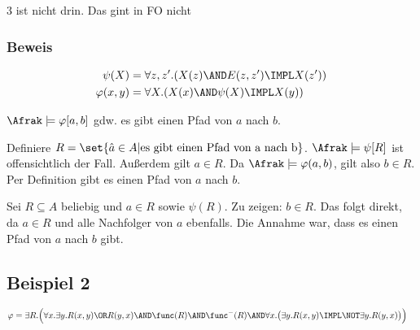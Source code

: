 3 ist nicht drin. Das gint in FO nicht

\subsubsection{Beweis}

\begin{align*}
  \psi(X) &= \forall z,z'.(X(z) \AND E(z,z') \IMPL X(z'))\\
  \varphi(x,y) &= \forall X.(X(x) \AND \psi(X) \IMPL X(y))
\end{align*}

\begin{description}[style=nextline]
  \item[Behauptung:] $\Afrak\models\varphi[a,b]$ gdw. es gibt einen Pfad von $a$ nach $b$.
  
  \item[\enquote{$\Rightarrow$}]
  Definiere $R=\set{\hat{a}\in A| \text{es gibt einen Pfad von a nach b}}$.
  $\Afrak\models\psi[R]$ ist offensichtlich der Fall. Außerdem gilt $a\in R$.
  Da $\Afrak\models\varphi(a,b)$, gilt also $b\in R$. Per Definition gibt
  es einen Pfad von $a$ nach $b$.
  
  \item[\enquote{$\Leftarrow$}]
  Sei $R\subseteq A$ beliebig und $a\in R$ sowie $\psi(R)$. Zu zeigen: $b\in R$.
  Das folgt direkt, da $a\in R$ und alle Nachfolger von $a$ ebenfalls.
  Die Annahme war, dass es einen Pfad von $a$ nach $b$ gibt.
\end{description}

\subsection{Beispiel 2}

\begin{align*}
  \varphi &= \exists R.\Bigl(
    \forall x.\exists y.R(x,y) \OR R(y,x)
    \AND \func(R)
    \AND \func^-(R)
    \AND \forall x.\bigl(\exists y.R(x,y) \IMPL \NOT\exists y.R(y,x)\bigr)
  \Bigr)
\end{align*}
